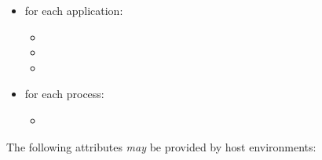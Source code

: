 \begin{itemize}
    \item for each application:
        \begin{itemize}
            \item {}
            \item {}
            \item {}
        \end{itemize}
    \item for each process:
        \begin{itemize}
            \item {}
        \end{itemize}
\end{itemize}

\reqattrend


\optattrstart

The following attributes \textit{may} be provided by host environments:

